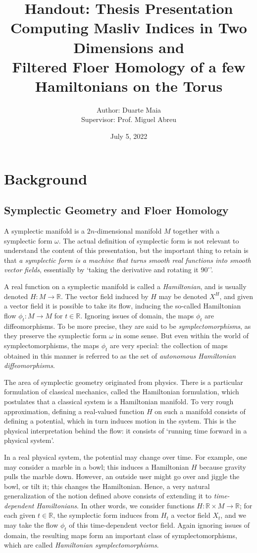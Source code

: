 \documentclass[11pt, a4paper]{article}
\title{Handout: Thesis Presentation\\
Computing Masliv Indices in Two Dimensions and\\
Filtered Floer Homology of a few Hamiltonians on the Torus}
\author{Author: Duarte Maia\\
Supervisor: Prof. Miguel Abreu}
\date{July 5, 2022}
\theoremstyle{nonumberplain}
\newcommand{\R}{\mathbb{R}}
\begin{document}
\maketitle

\section{Background}

\subsection{Symplectic Geometry and Floer Homology}

A symplectic manifold is a $2n$-dimensional manifold $M$ together with a symplectic form $\omega$. The actual definition of symplectic form is not relevant to understand the content of this presentation, but the important thing to retain is that \emph{a symplectic form is a machine that turns smooth real functions into smooth vector fields}, essentially by `taking the derivative and rotating it $90^\circ$'.

A real function on a symplectic manifold is called a \emph{Hamiltonian}, and is usually denoted $H \colon M \to \R$. The vector field induced by $H$ may be denoted $X^H$, and given a vector field it is possible to take its flow, inducing the so-called Hamiltonian flow $\phi_t \colon M \to M$ for $t \in \R$. Ignoring issues of domain, the maps $\phi_t$ are diffeomorphisms. To be more precise, they are said to be \emph{symplectomorphisms}, as they preserve the symplectic form $\omega$ in some sense. But even within the world of symplectomorphisms, the maps $\phi_t$ are very special: the collection of maps obtained in this manner is referred to as the set of \emph{autonomous Hamiltonian diffeomorphisms}.

The area of symplectic geometry originated from physics. There is a particular formulation of classical mechanics, called the Hamiltonian formulation, which postulates that a classical system is a Hamiltonian manifold. To very rough approximation, defining a real-valued function $H$ on such a manifold consists of defining a potential, which in turn induces motion in the system. This is the physical interpretation behind the flow: it consists of `running time forward in a physical system'.

In a real physical system, the potential may change over time. For example, one may consider a marble in a bowl; this induces a Hamiltonian $H$ because gravity pulls the marble down. However, an outside user might go over and jiggle the bowl, or tilt it; this changes the Hamiltonian. Hence, a very natural generalization of the notion defined above consists of extending it to \emph{time-dependent Hamiltonians}. In other words, we consider functions $H \colon \R \times M \to \R$; for each given $t \in \R$, the symplectic form induces from $H_t$ a vector field $X_t$, and we may take the flow $\phi_t$ of this time-dependent vector field. Again ignoring issues of domain, the resulting maps form an important class of symplectomorphisms, which are called \emph{Hamiltonian symplectomorphisms}.
\end{document}
